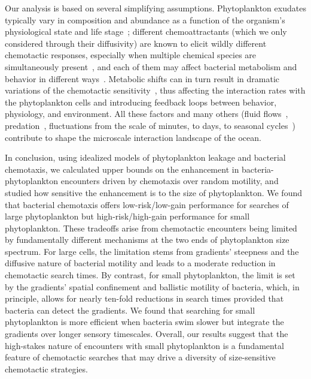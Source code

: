 \documentclass[9pt,twocolumn,twoside]{pnas-new}
\begin{document}
Our analysis is based on several simplifying assumptions. Phytoplankton exudates typically vary in composition and abundance as a function of the organism's physiological state and life stage~\cite{maranon2004significance,thornton2014dissolved,seymour2017zooming}; different chemoattractants (which we only considered through their diffusivity) are known to elicit wildly different chemotactic responses, especially when multiple chemical species are simultaneously present~\cite{clerc2023strong,li2024phenotypic}, and each of them may affect bacterial metabolism and behavior in different ways~\cite{barak-gavish2023bacterial,stubbusch2023polysaccharide}. Metabolic shifts can in turn result in dramatic variations of the chemotactic sensitivity~\cite{egbert2010minimal,ni2020growthrate}, thus affecting the interaction rates with the phytoplankton cells and introducing feedback loops between behavior, physiology, and environment. All these factors and many others (fluid flows~\cite{bowen1993simulating,blackburn1999influence,kiorboe2001marine,taylor2012tradeoffs}, predation~\cite{nielsen2021foraging}, fluctuations from the scale of minutes, to days, to seasonal cycles~\cite{bernhardt2020life,karin2021temporal,nguyen2021environmental}) contribute to shape the microscale interaction landscape of the ocean.


In conclusion, using idealized models of phytoplankton leakage and bacterial chemotaxis, we calculated upper bounds on the enhancement in bacteria-phytoplankton encounters driven by chemotaxis over random motility, and studied how sensitive the enhancement is to the size of phytoplankton. We found that bacterial chemotaxis offers low-risk/low-gain performance for searches of large phytoplankton but high-risk/high-gain performance for small phytoplankton. These tradeoffs arise from chemotactic encounters being limited by fundamentally different mechanisms at the two ends of phytoplankton size spectrum. For large cells, the limitation stems from gradients' steepness and the diffusive nature of bacterial motility and leads to a moderate reduction in chemotactic search times. By contrast, for small phytoplankton, the limit is set by the gradients' spatial confinement and ballistic motility of bacteria, which, in principle, allows for nearly ten-fold reductions in search times provided that bacteria can detect the gradients. We found that searching for small phytoplankton is more efficient when bacteria swim slower but integrate the gradients over longer sensory timescales. Overall, our results suggest that the high-stakes nature of encounters with small phytoplankton is a fundamental feature of chemotactic searches that may drive a diversity of size-sensitive chemotactic strategies.
\end{document}

